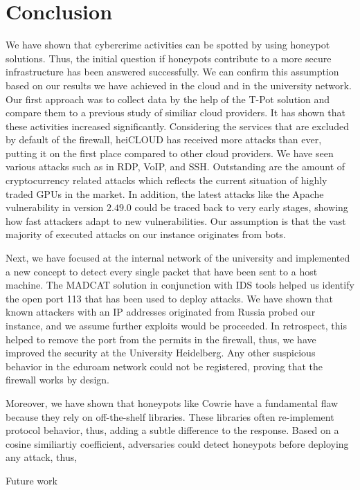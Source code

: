 \chapter{Conclusion}

We have shown that cybercrime activities can be spotted by using honeypot solutions.
Thus, the initial question if honeypots contribute to a more secure infrastructure has been answered successfully.
We can confirm this assumption based on our results we have achieved in the cloud and in the university network.
Our first approach was to collect data by the help of the T-Pot solution and compare them to a previous study of similiar cloud providers.
It has shown that these activities increased significantly.
Considering the services that are excluded by default of the firewall, heiCLOUD has received more attacks than ever, putting it on the first place compared to other cloud providers.
We have seen various attacks such as in RDP, VoIP, and SSH.
Outstanding are the amount of cryptocurrency related attacks which reflects the current situation of highly traded GPUs in the market.
In addition, the latest attacks like the Apache vulnerability in version $2.49.0$ could be traced back to very early stages, showing how fast attackers adapt to new vulnerabilities.
Our assumption is that the vast majority of executed attacks on our instance originates from bots.

Next, we have focused at the internal network of the university and implemented a new concept to detect every single packet that have been sent to a host machine.
The MADCAT solution in conjunction with IDS tools helped us identify the open port 113 that has been used to deploy attacks.
We have shown that known attackers with an IP addresses originated from Russia probed our instance, and we assume further exploits would be proceeded.
In retrospect, this helped to remove the port from the permits in the firewall, thus, we have improved the security at the University Heidelberg.
Any other suspicious behavior in the eduroam network could not be registered, proving that the firewall works by design.

Moreover, we have shown that honeypots like Cowrie have a fundamental flaw because they rely on off-the-shelf libraries.
These libraries often re-implement protocol behavior, thus, adding a subtle difference to the response.
Based on a cosine similiartiy coefficient, adversaries could detect honeypots before deploying any attack, thus, 

Future work



